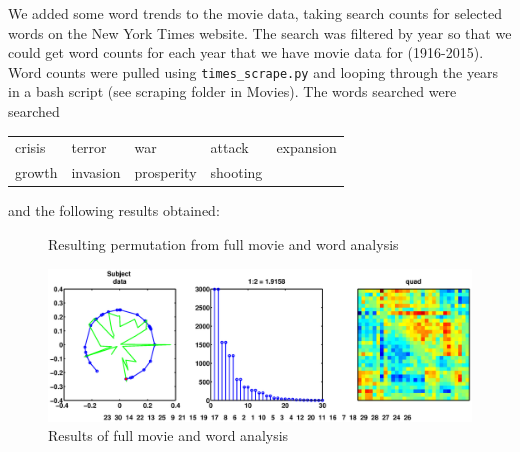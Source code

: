 \documentclass[11pt]{article}
\begin{document}
We added some word trends to the movie data, taking search counts for selected words on the New York Times website. The search was filtered by year so that we could get word counts for each year that we have movie data for (1916-2015). Word counts were pulled using \verb|times_scrape.py| and looping through the years in a bash script (see scraping folder in Movies). The words searched were searched

\begin{center}
\begin{tabular}{lllll}
crisis&
terror&
war&
attack&
expansion\\
growth&
invasion&
prosperity&
shooting&
\end{tabular}
\end{center}

and the following results obtained:

\begin{figure}[H]
\centering
\begin{minipage}{.25\textwidth}
\end{minipage}
\begin{minipage}{.25\textwidth}
\end{minipage}
\begin{minipage}{.25\textwidth}
\end{minipage}
\caption{Resulting permutation from full movie and word analysis}
\end{figure}

\begin{figure}[H]
\includegraphics[trim = 150 0 130 0, clip, width=\textwidth]{pictures/movie_word_all.eps}
\caption{Results of full movie and word analysis}
\end{figure}
\end{document}
